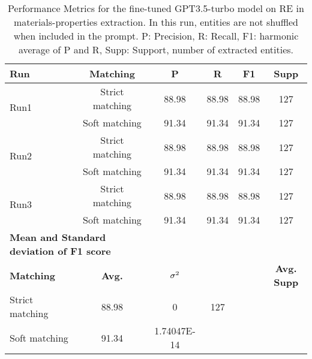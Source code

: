 \begin{table}[htbp]
    \small
    \centering
    \caption{Performance Metrics for the fine-tuned GPT3.5-turbo model on RE in materials-properties extraction. In this run, entities are not shuffled when included in the prompt. P: Precision, R: Recall, F1: harmonic average of P and R, Supp: Support, number of extracted entities.}
    \begin{tabular}{lccccc}
        \toprule
        \textbf{Run} & \textbf{Matching} & \textbf{P} & \textbf{R} & \textbf{F1} & \textbf{Supp} \\
        \midrule
        \multirow{2}{*}{Run1} & Strict matching & 88.98 & 88.98 & 88.98 & 127 \\
        & Soft matching & 91.34 & 91.34 & 91.34 & 127 \\
        \midrule
        \multirow{2}{*}{Run2} & Strict matching & 88.98 & 88.98 & 88.98 & 127 \\
        & Soft matching & 91.34 & 91.34 & 91.34 & 127 \\
        \midrule
        \multirow{2}{*}{Run3} & Strict matching & 88.98 & 88.98 & 88.98 & 127 \\
        & Soft matching & 91.34 & 91.34 & 91.34 & 127 \\
        \midrule
        \multicolumn{2}{l}{\textbf{Mean and Standard deviation of F1 score}} & & & & \\
        \midrule
        \textbf{Matching} & \textbf{Avg.} & $\sigma\textsuperscript{2}$ & & & \textbf{Avg. Supp}\\
        Strict matching & 88.98 & 0 & 127 \\
        Soft matching & 91.34 & 1.74047E-14 & \\
        \bottomrule
    \end{tabular}
\end{table}


